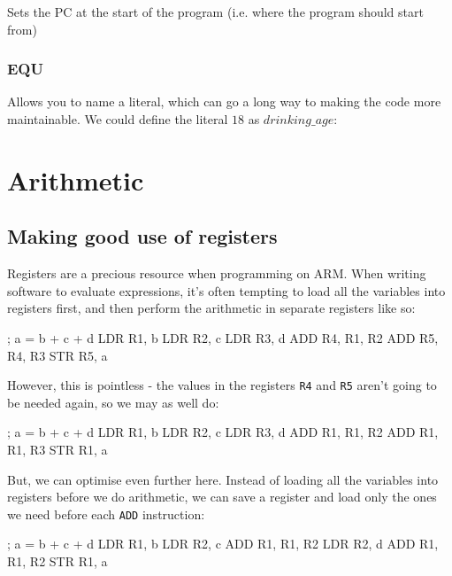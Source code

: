 Sets the PC at the start of the program (i.e. where the program should start
from)

\subsubsection{EQU}

Allows you to name a literal, which can go a long way to making the code more
maintainable. We could define the literal $18$ as $drinking\_age$:


\section{Arithmetic}

\subsection{Making good use of registers}

Registers are a precious resource when programming on ARM. When writing software
to evaluate expressions, it's often tempting to load all the variables into
registers first, and then perform the arithmetic in separate registers like so:

\begin{listing}{1}
	; a = b + c + d
	LDR 	R1, b
	LDR 	R2, c
	LDR 	R3, d
	ADD 	R4, R1, R2
	ADD 	R5, R4, R3
	STR 	R5, a
\end{listing}

However, this is pointless - the values in the registers {\tt R4} and {\tt R5}
aren't going to be needed again, so we may as well do:

\begin{listing}{1}
; a = b + c + d
LDR 	R1, b
LDR 	R2, c
LDR 	R3, d
ADD 	R1, R1, R2
ADD 	R1, R1, R3
STR 	R1, a
\end{listing}

But, we can optimise even further here. Instead of loading all the variables
into registers before we do arithmetic, we can save a register and load only the
ones we need before each {\tt ADD} instruction:

\begin{listing}{1}
; a = b + c + d
LDR 	R1, b
LDR 	R2, c
ADD 	R1, R1, R2
LDR 	R2, d
ADD 	R1, R1, R2
STR 	R1, a
\end{listing}

